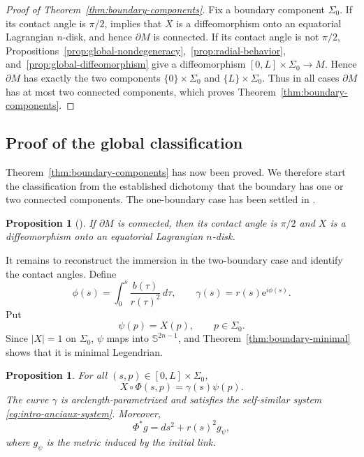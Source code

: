 \documentclass[11pt,a4paper]{article}
\numberwithin{equation}{section}
\newtheorem{proposition}[theorem]{Proposition}
\newcommand{\Sph}{\mathbb S}
\newcommand{\ee}{\mathrm e}
\begin{document}
\begin{proof}[Proof of Theorem~\ref{thm:boundary-components}]
Fix a boundary component $\Sigma_0$.  If its contact angle is $\pi/2$,
\cite[Theorem~1.3]{GaoMaYao2026} implies that $X$ is a
diffeomorphism onto an equatorial Lagrangian $n$-disk, and hence $\partial M$
is connected.  If its contact angle is not $\pi/2$, Propositions~\ref{prop:global-nondegeneracy},~\ref{prop:radial-behavior}, and~\ref{prop:global-diffeomorphism} give a diffeomorphism $[0,L]\times\Sigma_0\longrightarrow M.$
Hence $\partial M$ has exactly the two components $\{0\}\times\Sigma_0$ and $\{L\}\times\Sigma_0$.  Thus in all cases
\(\partial M\) has at most two connected components,
which proves Theorem~\ref{thm:boundary-components}.
\end{proof}


\subsection{Proof of the global classification}

Theorem~\ref{thm:boundary-components} has now been proved.  We therefore start the classification from the established dichotomy that the boundary has one or two connected components.  The one-boundary case has been settled in \cite{GaoMaYao2026}. 


\begin{proposition}[{\cite[Corollary~3.8]{GaoMaYao2026}}]
\label{prop:one-boundary-classification}
If $\partial M$ is connected, then its contact angle is $\pi/2$ and $X$ is a diffeomorphism onto an equatorial Lagrangian $n$-disk.
\end{proposition}

It remains to reconstruct the immersion in the two-boundary case and identify the contact angles. Define
\begin{equation*}
        \phi(s)=\int_0^s\frac{b(\tau)}{r(\tau)^2}\,d\tau,
        \qquad
        \gamma(s)=r(s)\ee^{i\phi(s)}.
\end{equation*}
Put
\begin{equation*}
        \psi(p)=X(p),
        \qquad p\in\Sigma_0.
\end{equation*}
Since $|X|=1$ on $\Sigma_0$, $\psi$ maps into $\Sph^{2n-1}$, and Theorem~\ref{thm:boundary-minimal} shows that it is minimal Legendrian.



\begin{proposition}\label{prop:global-product}
For all $(s,p)\in[0,L]\times\Sigma_0$,
\begin{equation}\label{eq:global-product-final}
        X\circ\Phi(s,p)=\gamma(s)\psi(p).
\end{equation}
The curve $\gamma$ is arclength-parametrized and satisfies the self-similar system \eqref{eq:intro-anciaux-system}.  Moreover,
\begin{equation}\label{eq:global-warped-metric}
        \Phi^*g=ds^2+r(s)^2g_\psi,
\end{equation}
where $g_\psi$ is the metric induced by the initial link.
\end{proposition}
\end{document}
